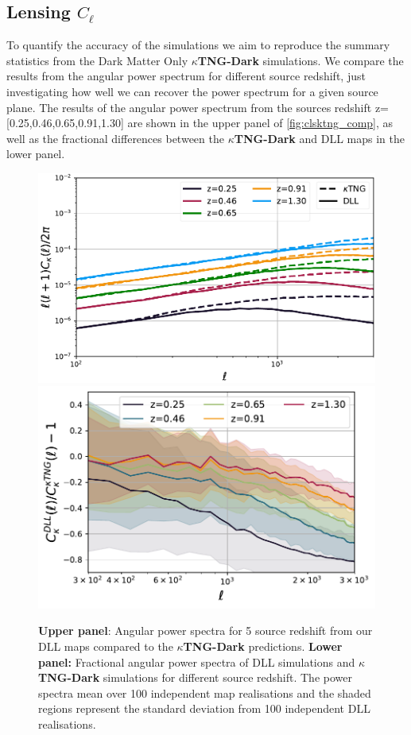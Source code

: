\documentclass{aa}
\begin{document}
\subsection{Lensing $C_\ell$}
To quantify the accuracy of the simulations we aim to reproduce the summary statistics from the Dark Matter Only \textbf{$\kappa$TNG-Dark} simulations. 
We compare the results from the angular power spectrum for different source redshift, just investigating how well we can recover the power spectrum for a given source plane. The results of the angular power spectrum from the sources redshift z=[0.25,0.46,0.65,0.91,1.30] are shown in the upper panel of \autoref{fig:clsktng_comp}, as well as the fractional differences between the \textbf{$\kappa$TNG-Dark} and DLL maps in the lower panel.
\begin{figure}
    \centering
    \includegraphics[width=0.95\columnwidth]{paper/figures/cls_DLL_vs_ktng.pdf}
    \includegraphics[width=\columnwidth]{paper/figures/res_cls_DLL_vs_ktng.pdf}
    \caption{
    \textbf{Upper panel}: Angular power spectra for 5 source redshift from
our DLL maps compared to the \textbf{$\kappa$TNG-Dark} predictions.
 \textbf{Lower panel:} Fractional angular power spectra of DLL simulations and \textbf{$\kappa$TNG-Dark} simulations for different source redshift.
  The power spectra mean over 100 independent map realisations and the shaded regions represent the standard deviation from 100 independent DLL realisations.}
     \label{fig:clsktng_comp}
\end{figure}
\end{document}
